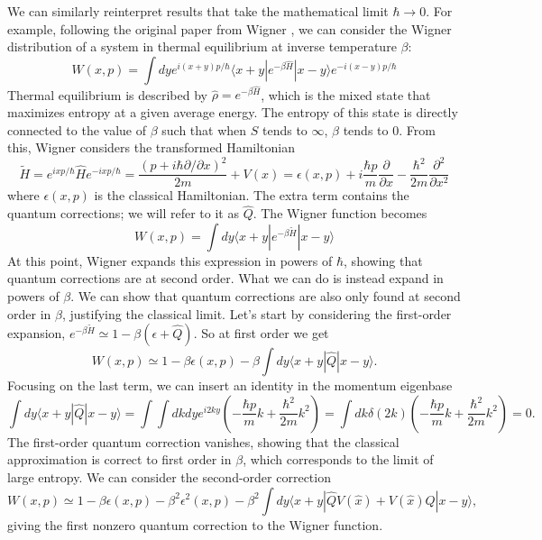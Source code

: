 \documentclass{article}
\begin{document}
We can similarly reinterpret results that take the mathematical limit $\hbar \to 0$. For example, following the original paper from Wigner \cite{WignerLimit}, we can consider the Wigner distribution of a system in thermal equilibrium at inverse temperature $\beta$:
\begin{equation}
    W(x,p)=\int dy e^{i(x+y)p/\hbar}\langle x+y |e^{-\beta\hat{H}}|x-y \rangle e^{-i(x-y)p/\hbar}
\end{equation}
Thermal equilibrium is described by $\hat{\rho}=e^{-\beta \hat{H}}$, which is the mixed state that maximizes entropy at a given average energy. The entropy of this state is directly connected to the value of $\beta$ such that when $S$ tends to $\infty$, $\beta$ tends to 0.
From this, Wigner considers the transformed Hamiltonian
\begin{equation}
    \tilde{H}=e^{i x p/\hbar}\hat{H} e^{-i x p/\hbar}=\frac{(p+i\hbar\partial/\partial x)^2}{2m}+V(x)=\epsilon(x,p)+i\frac{\hbar p}{m}\frac{\partial}{\partial x}-\frac{\hbar^2}{2m}\frac{\partial^2}{\partial x^2}
\end{equation}
where $\epsilon(x,p)$ is the classical Hamiltonian. The extra term contains the quantum corrections; we will refer to it as $\hat{Q}$. The Wigner function becomes
\begin{equation}
    W(x,p)=\int dy \langle x+y |e^{-\beta\tilde{H}}|x-y \rangle 
\end{equation}
At this point, Wigner expands this expression in powers of $\hbar$, showing that quantum corrections are at second order. What we can do is instead expand in powers of $\beta$. We can show that quantum corrections are also only found at second order in $\beta$, justifying the classical limit. Let's start by considering the first-order expansion, $e^{-\beta\tilde{H}}\simeq 1-\beta(\epsilon+\hat{Q})$. So at first order
we get
\begin{equation}
    W(x,p)\simeq 1-\beta \epsilon(x,p)-\beta\int dy\langle x+y |\hat{Q}|x-y \rangle.
\end{equation}
Focusing on the last term, we can insert an identity in the momentum eigenbase
\begin{equation}
  \int dy\langle x+y |\hat{Q}|x-y \rangle=\int\int dkdy e^{i2ky} \left(-\frac{\hbar p}{m}k+\frac{\hbar^2}{2m}k^2\right)=\int dk \delta(2k) \left(-\frac{\hbar p}{m}k+\frac{\hbar^2}{2m}k^2\right)=0.
\end{equation}
The first-order quantum correction vanishes, showing that the classical approximation is correct to first order in $\beta$, which corresponds to the limit of large entropy. We can consider the second-order correction
\begin{equation}
     W(x,p)\simeq 1-\beta \epsilon(x,p)-\beta^2\epsilon^2(x,p)-\beta^2\int dy\langle x+y |\hat{Q}V(\hat{x})+V(\hat{x}) \hat{Q}|x-y \rangle,
\end{equation}
giving the first nonzero quantum correction to the Wigner function.
\end{document}
